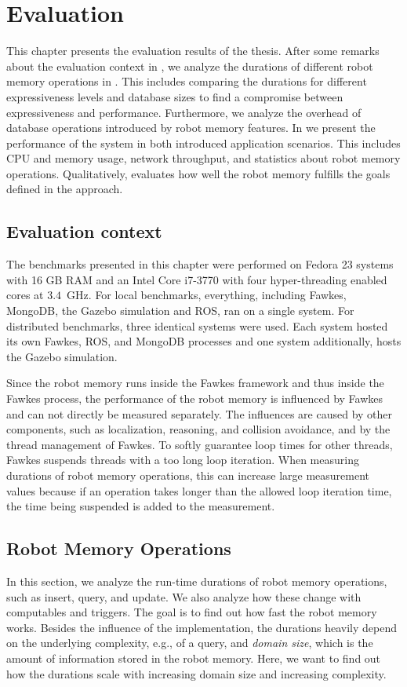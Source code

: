 \chapter{Evaluation}
\label{chap:evaluation}
This chapter presents the evaluation results of the thesis. After some
remarks about the evaluation context in , we
analyze the durations of different robot memory operations in
. This includes comparing the durations for
different expressiveness levels and database sizes to find a
compromise between expressiveness and performance. Furthermore, we
analyze the overhead of database operations introduced by robot memory
features. In  we present the performance of
the system in both introduced application scenarios. This includes CPU
and memory usage, network throughput, and statistics about robot
memory operations. Qualitatively,  evaluates
how well the robot memory fulfills the goals defined in the approach.

\section{Evaluation context}
\label{sec:eval-context}
The benchmarks presented in this chapter were performed on Fedora 23
systems with 16 GB RAM and an Intel Core i7-3770 with four hyper-threading enabled cores at
$3.4$~GHz. For local benchmarks, everything, including Fawkes, MongoDB,
the Gazebo simulation and ROS, ran on a single system. For distributed
benchmarks, three identical systems were used. Each system hosted its
own Fawkes, ROS, and MongoDB processes and one system additionally,
hosts the Gazebo simulation.

Since the robot memory runs inside the Fawkes framework and thus
inside the Fawkes process, the performance of the robot memory is
influenced by Fawkes and can not directly be measured separately. The
influences are caused by other components, such as localization,
reasoning, and collision avoidance, and by the thread management of
Fawkes. To softly guarantee loop times for other threads, Fawkes
suspends threads with a too long loop iteration. When measuring
durations of robot memory operations, this can increase large
measurement values because if an operation takes longer than the
allowed loop iteration time, the time being suspended is added to the
measurement.

\section{Robot Memory Operations}
\label{sec:op-durations}
In this section, we analyze the run-time durations of robot memory
operations, such as insert, query, and update. We also analyze how
these change with computables and triggers. The goal is to find out
how fast the robot memory works. Besides the influence of the
implementation, the durations heavily depend on the underlying
complexity, e.g., of a query, and \emph{domain size}, which is the
amount of information stored in the robot memory. Here, we want to
find out how the durations scale with increasing domain size and
increasing complexity.

